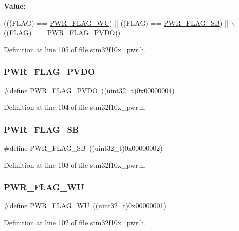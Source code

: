 {\bfseries Value\+:}
\begin{DoxyCode}
(((FLAG) == \hyperlink{group___p_w_r___flag_ga2d06760a5769e729b06d41e37036d58e}{PWR\_FLAG\_WU}) || ((FLAG) == \hyperlink{group___p_w_r___flag_ga9e55f0b5dec2346d5c8dee3ab3c0c2df}{PWR\_FLAG\_SB}) || \(\backslash\)
                               ((FLAG) == \hyperlink{group___p_w_r___flag_gaefd05d58cc050eeef83a1b5c520b2c2a}{PWR\_FLAG\_PVDO}))
\end{DoxyCode}


Definition at line 105 of file stm32f10x\+\_\+pwr.\+h.

\mbox{\label{group___p_w_r___flag_gaefd05d58cc050eeef83a1b5c520b2c2a}} 
\subsubsection{\texorpdfstring{P\+W\+R\+\_\+\+F\+L\+A\+G\+\_\+\+P\+V\+DO}{PWR\_FLAG\_PVDO}}
{\footnotesize\ttfamily \#define P\+W\+R\+\_\+\+F\+L\+A\+G\+\_\+\+P\+V\+DO~((uint32\+\_\+t)0x00000004)}



Definition at line 104 of file stm32f10x\+\_\+pwr.\+h.

\mbox{\label{group___p_w_r___flag_ga9e55f0b5dec2346d5c8dee3ab3c0c2df}} 
\subsubsection{\texorpdfstring{P\+W\+R\+\_\+\+F\+L\+A\+G\+\_\+\+SB}{PWR\_FLAG\_SB}}
{\footnotesize\ttfamily \#define P\+W\+R\+\_\+\+F\+L\+A\+G\+\_\+\+SB~((uint32\+\_\+t)0x00000002)}



Definition at line 103 of file stm32f10x\+\_\+pwr.\+h.

\mbox{\label{group___p_w_r___flag_ga2d06760a5769e729b06d41e37036d58e}} 
\subsubsection{\texorpdfstring{P\+W\+R\+\_\+\+F\+L\+A\+G\+\_\+\+WU}{PWR\_FLAG\_WU}}
{\footnotesize\ttfamily \#define P\+W\+R\+\_\+\+F\+L\+A\+G\+\_\+\+WU~((uint32\+\_\+t)0x00000001)}



Definition at line 102 of file stm32f10x\+\_\+pwr.\+h.

